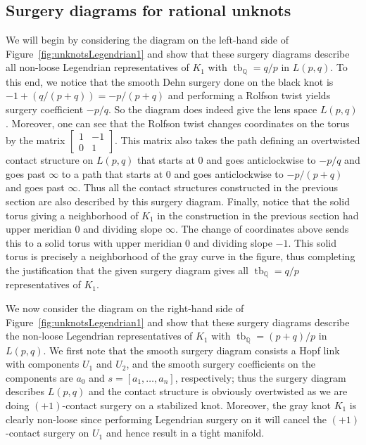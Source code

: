 \documentclass[11pt]{amsart}
\theoremstyle{plain}
\theoremstyle{definition}
\theoremstyle{remark}
\numberwithin{theorem}{section}
\newcommand{\Q}{\mathbb{Q}}           %
\DeclareMathOperator\tb{tb}                   %
\begin{document}
\subsection{Surgery diagrams for rational unknots}\label{sdru}

We will begin by considering the diagram on the left-hand side of Figure~\ref{fig:unknotsLegendrian1} and show that these surgery diagrams describe all non-loose Legendrian representatives of $K_1$ with $\tb_\Q=q/p$ in $L(p,q)$. To this end, we notice that the smooth Dehn surgery done on the black knot is $-1+(q/(p+q))=-p/(p+q)$ and performing a Rolfson twist yields surgery coefficient $-p/q$. So the diagram does indeed give the lens space $L(p,q)$. Moreover, one can see that the Rolfson twist changes coordinates on the torus by the matrix $\begin{bmatrix}1& -1\\ 0&1\end{bmatrix}$. This matrix also takes the path defining an overtwisted contact structure on $L(p,q)$ that starts at $0$ and goes anticlockwise to $-p/q$ and goes past $\infty$ to a path that starts at $0$ and goes anticlockwise to $-p/(p+q)$ and goes past $\infty$. Thus all the contact structures constructed in the previous section are also described by this surgery diagram. Finally, notice that the solid torus giving a neighborhood of $K_1$ in the construction in the previous section had upper meridian $0$ and dividing slope $\infty$. The change of coordinates above sends this to a solid torus with upper meridian $0$ and dividing slope $-1$. This solid torus is precisely a neighborhood of the gray curve in the figure, thus completing the justification that the given surgery diagram gives all $\tb_\Q=q/p$ representatives of $K_1$. 



We now consider the diagram on the right-hand side of Figure~\ref{fig:unknotsLegendrian1} and show that these surgery diagrams describe the non-loose Legendrian representatives of $K_1$ with $\tb_\Q=(p+q)/p$ in $L(p,q)$. We first note that the smooth surgery diagram consists a Hopf link with components $U_1$ and $U_2$, and the smooth surgery coefficients on the components are $a_0$ and $s=[a_1,\ldots, a_n]$, respectively; thus the surgery diagram describes $L(p,q)$ and the contact structure is obviously overtwisted as we are doing $(+1)$-contact surgery on a stabilized knot. Moreover, the gray knot $K_1$ is clearly non-loose since performing Legendrian surgery on it will cancel the $(+1)$-contact surgery on $U_1$ and hence result in a tight manifold. 
\end{document}
